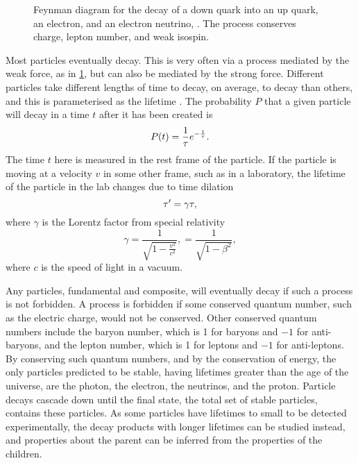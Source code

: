 \begin{figure}
  \centering
  
  \caption{%
    Feynman diagram for the decay of a down quark into an up quark, an 
    electron, and an electron neutrino, \decay{\Pdown}{\Pup\Pelectron\APnue}.
    The process conserves charge, lepton number, and weak isospin.
  }
  \label{fig:intro:sm:neutron_decay}
\end{figure}


Most particles eventually decay.
This is very often via a process mediated by the weak force, as in 
\cref{fig:intro:sm:neutron_decay}, but can also be mediated by the strong 
force.
Different particles take different lengths of time to decay, on average, to 
decay than others, and this is parameterised as the lifetime \lifetime.
The probability $P$ that a given particle will decay in a time $t$ after it has 
been created is
\begin{equation}
  P(t) = \frac{1}{\tau}e^{-\frac{t}{\tau}}.
  \label{eqn:intro:sm:lifetime}
\end{equation}
The time $t$ here is measured in the rest frame of the particle.
If the particle is moving at a velocity $v$ in some other frame, such as in a 
laboratory, the lifetime of the particle in the lab changes due to time 
dilation
\begin{equation}
  \tau' = \gamma\tau,
  \label{eqn:intro:sm:lifetime_lab}
\end{equation}
where $\gamma$ is the Lorentz factor from special relativity
\begin{equation}
  \gamma = \frac{1}{\sqrt{1 - \frac{v^{2}}{c^{2}}}},
         = \frac{1}{\sqrt{1 - \beta^{2}}},
  \label{eqn:intro:sm:lorentz_factor}
\end{equation}
where $c$ is the speed of light in a vacuum.

Any particles, fundamental and composite, will eventually decay if such a 
process is not forbidden.
A process is forbidden if some conserved quantum number, such as the electric 
charge, would not be conserved.
Other conserved quantum numbers include the baryon number, which is 1 for 
baryons and $-1$ for anti-baryons, and the lepton number, which is 1 for 
leptons and $-1$ for anti-leptons.
By conserving such quantum numbers, and by the conservation of energy, the only 
particles predicted to be stable, having lifetimes greater than the age of the 
universe, are the photon, the electron, the neutrinos, and the proton.
Particle decays cascade down until the final state, the total set of stable 
particles, contains these particles.
As some particles have lifetimes to small to be detected experimentally, the 
decay products with longer lifetimes can be studied instead, and properties 
about the parent can be inferred from the properties of the children.

